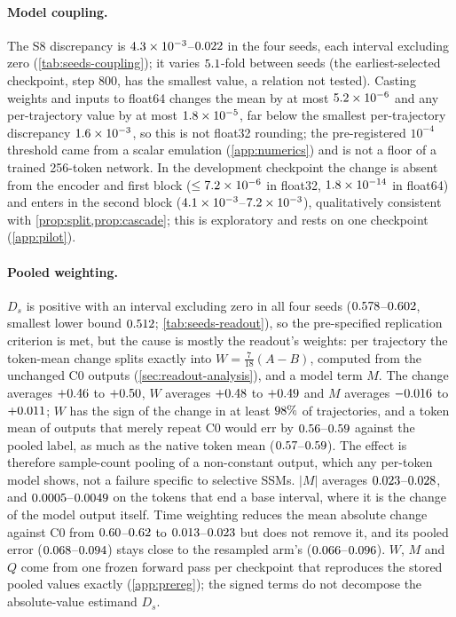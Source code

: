 \documentclass{article}
\theoremstyle{plain}
\theoremstyle{definition}
\theoremstyle{remark}
\begin{document}




\paragraph{Model coupling.}
The S8 discrepancy is $4.3\times10^{-3}$--$0.022$ in the four seeds, each interval excluding zero (\cref{tab:seeds-coupling}); it varies $5.1$-fold between seeds (the earliest-selected checkpoint, step 800, has the smallest value, a relation not tested).
Casting weights and inputs to float64 changes the mean by at most $5.2\times10^{-6}$ and any per-trajectory value by at most $1.8\times10^{-5}$, far below the smallest per-trajectory discrepancy $1.6\times10^{-3}$, so this is not float32 rounding; the pre-registered $10^{-4}$ threshold came from a scalar emulation (\cref{app:numerics}) and is not a floor of a trained 256-token network.
In the development checkpoint the change is absent from the encoder and first block ($\le7.2\times10^{-6}$ in float32, $1.8\times10^{-14}$ in float64) and enters in the second block ($4.1\times10^{-3}$--$7.2\times10^{-3}$), qualitatively consistent with \cref{prop:split,prop:cascade}; this is exploratory and rests on one checkpoint (\cref{app:pilot}).

\paragraph{Pooled weighting.}
$D_s$ is positive with an interval excluding zero in all four seeds ($0.578$--$0.602$, smallest lower bound $0.512$; \cref{tab:seeds-readout}), so the pre-specified replication criterion is met, but the cause is mostly the readout's weights: per trajectory the token-mean change splits exactly into $W=\tfrac{7}{18}(A-B)$, computed from the unchanged C0 outputs (\cref{sec:readout-analysis}), and a model term $M$.
The change averages $+0.46$ to $+0.50$, $W$ averages $+0.48$ to $+0.49$ and $M$ averages $-0.016$ to $+0.011$; $W$ has the sign of the change in at least $98\%$ of trajectories, and a token mean of outputs that merely repeat C0 would err by $0.56$--$0.59$ against the pooled label, as much as the native token mean ($0.57$--$0.59$).
The effect is therefore sample-count pooling of a non-constant output, which any per-token model shows, not a failure specific to selective SSMs.
$|M|$ averages $0.023$--$0.028$, and $0.0005$--$0.0049$ on the tokens that end a base interval, where it is the change of the model output itself.
Time weighting reduces the mean absolute change against C0 from $0.60$--$0.62$ to $0.013$--$0.023$ but does not remove it, and its pooled error ($0.068$--$0.094$) stays close to the resampled arm's ($0.066$--$0.096$).
$W$, $M$ and $Q$ come from one frozen forward pass per checkpoint that reproduces the stored pooled values exactly (\cref{app:prereg}); the signed terms do not decompose the absolute-value estimand $D_s$.
\end{document}
